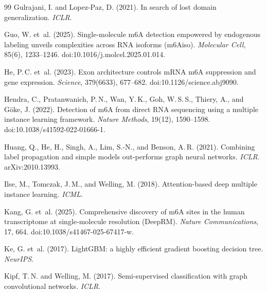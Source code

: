 \documentclass[11pt,a4paper]{article}
\begin{document}
\begin{thebibliography}{99}
    Gulrajani, I. and Lopez-Paz, D. (2021).
    \newblock In search of lost domain generalization.
    \newblock \textit{ICLR}.

    Guo, W. et~al. (2025).
    \newblock Single-molecule m6A detection empowered by endogenous labeling unveils complexities across RNA isoforms (m6Aiso).
    \newblock \textit{Molecular Cell}, 85(6), 1233--1246. doi:10.1016/j.molcel.2025.01.014.

    He, P.\,C. et~al. (2023).
    \newblock Exon architecture controls mRNA m6A suppression and gene expression.
    \newblock \textit{Science}, 379(6633), 677--682. doi:10.1126/science.abj9090.

    Hendra, C., Pratanwanich, P.\,N., Wan, Y.\,K., Goh, W.\,S.\,S., Thiery, A., and G\"oke, J. (2022).
    \newblock Detection of m6A from direct RNA sequencing using a multiple instance learning framework.
    \newblock \textit{Nature Methods}, 19(12), 1590--1598. doi:10.1038/s41592-022-01666-1.

    Huang, Q., He, H., Singh, A., Lim, S.-N., and Benson, A.\,R. (2021).
    \newblock Combining label propagation and simple models out-performs graph neural networks.
    \newblock \textit{ICLR}. arXiv:2010.13993.

    Ilse, M., Tomczak, J.\,M., and Welling, M. (2018).
    \newblock Attention-based deep multiple instance learning.
    \newblock \textit{ICML}.

    Kang, G. et~al. (2025).
    \newblock Comprehensive discovery of m6A sites in the human transcriptome at single-molecule resolution (DeepRM).
    \newblock \textit{Nature Communications}, 17, 664. doi:10.1038/s41467-025-67417-w.

    Ke, G. et~al. (2017).
    \newblock LightGBM: a highly efficient gradient boosting decision tree.
    \newblock \textit{NeurIPS}.

    Kipf, T.\,N. and Welling, M. (2017).
    \newblock Semi-supervised classification with graph convolutional networks.
    \newblock \textit{ICLR}.


\end{thebibliography}
\end{document}
